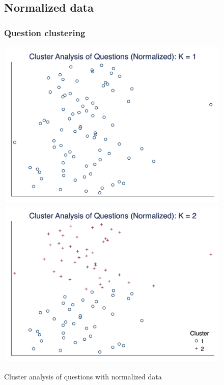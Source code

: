 \documentclass[10pt,leqno]{article}
\begin{document}
\pagebreak
\begin{figure}  [h!]
\subsection{Normalized data}
\subsubsection{Question clustering}
\begin{center}
\caption{Cluster analysis of questions with normalized data}
\includegraphics[scale=0.15]{CA_QuestionK1_NOR.png}
\includegraphics[scale=0.15]{CA_QuestionK2_NOR.png}

\end{center}
\end{figure}
\end{document}
